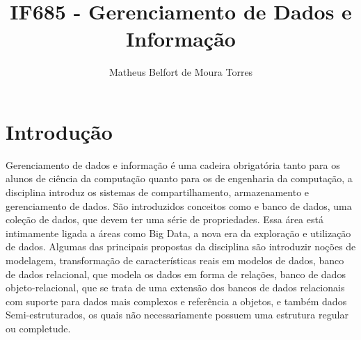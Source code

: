 \documentclass[a4paper]{article}
\title{IF685 - Gerenciamento de Dados e Informação}
\author{Matheus Belfort de Moura Torres}
\begin{document}
\maketitle

\section{Introdução}

Gerenciamento de dados e informação é uma cadeira obrigatória tanto para os alunos de ciência da computação\cite{CinSecGrad-cc} quanto para os de engenharia da computação\cite{CinSecGrad-ec}, a disciplina introduz os sistemas de compartilhamento, armazenamento e gerenciamento de dados. São introduzidos conceitos como e banco de dados, uma coleção de dados, que devem ter uma série de propriedades\cite{elmasri2011sistemas}. Essa área está intimamente ligada a áreas como Big Data, a nova era da exploração e utilização de dados\cite{IBM:2011:UBD:2132803}. Algumas das principais propostas da disciplina são introduzir noções de modelagem, transformação de características reais em modelos de dados\cite{IF685:2017.1}, banco de dados relacional, que modela os dados em forma de relações\cite{IF685:2017.1}, banco de dados objeto-relacional, que se trata de uma extensão dos bancos de dados relacionais com suporte para dados mais complexos e referência a objetos\cite{IF685:2017.1}, e também dados Semi-estruturados, os quais não necessariamente possuem uma estrutura regular ou completude\cite{IF685:2017.1}.
\end{document}
